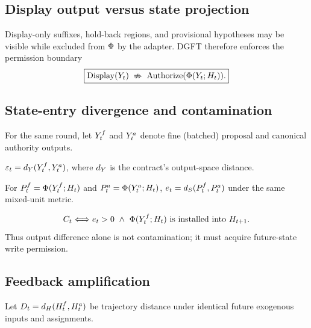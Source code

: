 \subsection{Display output versus state projection}\label{sec:model:display}

Display-only suffixes, hold-back regions, and provisional hypotheses may be
visible while excluded from $\Phi$ by the adapter. DGFT therefore enforces
the permission boundary
\begin{equation}\label{eq:invariant}
  \boxed{\mathrm{Display}(Y_t)\;\nRightarrow\;
  \mathrm{Authorize}(\Phi(Y_t;H_t)).}
\end{equation}

\subsection{State-entry divergence and contamination}\label{sec:model:divergence}

For the same round, let $Y_t^f$ and $Y_t^a$ denote fine (batched)
proposal and canonical authority outputs.

\begin{definition}\label{def:eps}
$\varepsilon_t=d_{Y}(Y_t^f,Y_t^a)$, where $d_{Y}$ is the
contract's output-space distance.
\end{definition}

\begin{definition}\label{def:e}
For $P_t^f=\Phi(Y_t^f;H_t)$ and
$P_t^a=\Phi(Y_t^a;H_t)$,
$e_t=d_{S}(P_t^f,P_t^a)$ under the same mixed-unit metric.
\end{definition}

\begin{definition}\label{def:contamination}
\[
  C_t \Longleftrightarrow e_t>0\ \wedge\
  \Phi(Y_t^f;H_t)\text{ is installed into }H_{t+1}.
\]
Thus output difference alone is not contamination; it must acquire
future-state write permission.
\end{definition}

\subsection{Feedback amplification}\label{sec:model:amplification}

Let $D_t=d_H(H_t^f,H_t^a)$ be trajectory distance under identical future
exogenous inputs and assignments.


